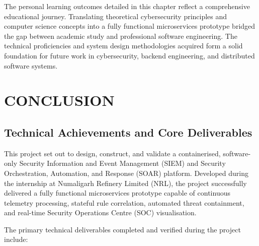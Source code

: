 The personal learning outcomes detailed in this chapter reflect a comprehensive educational journey. Translating theoretical cybersecurity principles and computer science concepts into a fully functional microservices prototype bridged the gap between academic study and professional software engineering. The technical proficiencies and system design methodologies acquired form a solid foundation for future work in cybersecurity, backend engineering, and distributed software systems.

\newpage
\chapter{CONCLUSION}

\section{Technical Achievements and Core Deliverables}

This project set out to design, construct, and validate a containerised, software-only Security Information and Event Management (SIEM) and Security Orchestration, Automation, and Response (SOAR) platform. Developed during the internship at Numaligarh Refinery Limited (NRL), the project successfully delivered a fully functional microservices prototype capable of continuous telemetry processing, stateful rule correlation, automated threat containment, and real-time Security Operations Centre (SOC) visualisation.

The primary technical deliverables completed and verified during the project include:

